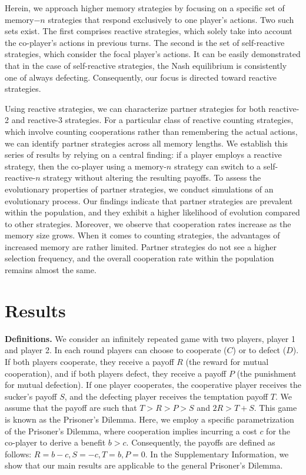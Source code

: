 \documentclass[11pt]{article}
\begin{document}
Herein, we approach higher memory strategies by focusing on a specific set of
memory$-n$ strategies that respond exclusively to one player's actions. Two such
sets exist. The first comprises reactive strategies, which solely take into
account the co-player's actions in previous turns. The second is the set of
self-reactive strategies, which consider the focal player's actions. It can be
easily demonstrated that in the case of self-reactive strategies, the Nash
equilibrium is consistently one of always defecting. Consequently, our focus is
directed toward reactive strategies.

Using reactive strategies, we can characterize partner strategies for both
reactive-2 and reactive-3 strategies. For a particular class of reactive
counting strategies, which involve counting cooperations rather than remembering
the actual actions, we can identify partner strategies across all memory
lengths. We establish this series of results by relying on a central finding: if
a player employs a reactive strategy, then the co-player using a memory-$n$
strategy can switch to a self-reactive-$n$ strategy without altering the
resulting payoffs. To assess the evolutionary properties of partner strategies,
we conduct simulations of an evolutionary process. Our findings indicate that
partner strategies are prevalent within the population, and they exhibit a
higher likelihood of evolution compared to other strategies. Moreover, we
observe that cooperation rates increase as the memory size grows.
When it comes to counting strategies, the advantages of increased
memory are rather limited. Partner strategies do not see a higher selection
frequency, and the overall cooperation rate within the population remains
almost the same.

\section*{Results}

\textbf{Definitions.}
We consider an infinitely repeated game with two players, player 1 and player 2.
In each round players can choose to cooperate ($C$) or to defect ($D$). If
both players cooperate, they receive a payoff $R$ (the reward for mutual
cooperation), and if both players defect, they receive a payoff $P$ (the
punishment for mutual defection). If one player cooperates, the cooperative
player receives the sucker's payoff $S$, and the defecting player receives the
temptation payoff $T$. We assume that the payoff are such that $T > R > P > S$
and $2 R > T + S$. This game is known as the Prisoner's Dilemma. Here, we employ
a specific parametrization of the Prisoner's Dilemma, where cooperation implies
incurring a cost $c$ for the co-player to derive a benefit $b > c$.
Consequently, the payoffs are defined as follows: \(R = b - c, S = -c, T = b, P
= 0\). In the Supplementary Information, we show that our main results
are applicable to the general Prisoner's Dilemma.
\end{document}
